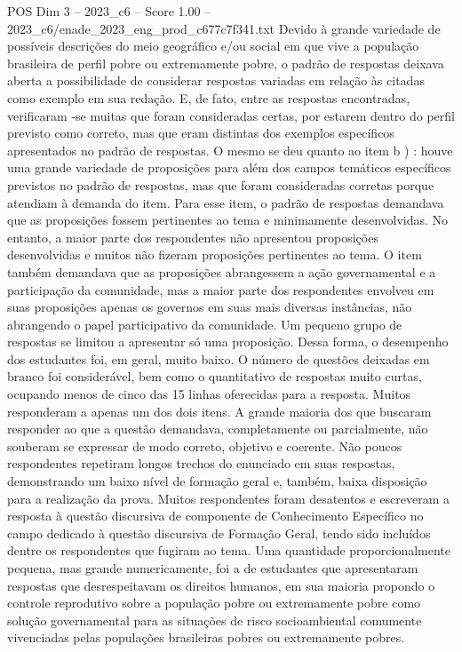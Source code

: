 \begin{textsample}{POS Dim 3 – 2023\_c6 – Score 1.00 – 2023\_c6/enade\_2023\_eng\_prod\_c677c7f341.txt}
Devido à grande variedade de possíveis descrições do meio geográfico e/ou social em que vive a população brasileira de perfil pobre ou extremamente pobre, o padrão de respostas deixava aberta a possibilidade de considerar respostas variadas em relação às citadas como exemplo em sua redação.
E, de fato, entre as respostas encontradas, verificaram -se muitas que foram consideradas certas, por estarem dentro do perfil previsto como correto, mas que eram distintas dos exemplos específicos apresentados no padrão de respostas.
O mesmo se deu quanto ao item b ) : houve uma grande variedade de proposições para além dos campos temáticos específicos previstos no padrão de respostas, mas que foram consideradas corretas porque atendiam à demanda do item.
Para esse item, o padrão de respostas demandava que as proposições fossem pertinentes ao tema e minimamente desenvolvidas.
No entanto, a maior parte dos respondentes não apresentou proposições desenvolvidas e muitos não fizeram proposições pertinentes ao tema.
O item também demandava que as proposições abrangessem a ação governamental e a participação da comunidade, mas a maior parte dos respondentes envolveu em suas proposições apenas os governos em suas mais diversas instâncias, não abrangendo o papel participativo da comunidade.
Um pequeno grupo de respostas se limitou a apresentar só uma proposição.
Dessa forma, o desempenho dos estudantes foi, em geral, muito baixo.
O número de questões deixadas em branco foi considerável, bem como o quantitativo de respostas muito curtas, ocupando menos de cinco das 15 linhas oferecidas para a resposta.
Muitos responderam a apenas um dos dois itens.
A grande maioria dos que buscaram responder ao que a questão demandava, completamente ou parcialmente, não souberam se expressar de modo correto, objetivo e coerente.
Não poucos respondentes repetiram longos trechos do enunciado em suas respostas, demonstrando um baixo nível de formação geral e, também, baixa disposição para a realização da prova.
Muitos respondentes foram desatentos e escreveram a resposta à questão discursiva de componente de Conhecimento Específico no campo dedicado à questão discursiva de Formação Geral, tendo sido incluídos dentre os respondentes que fugiram ao tema.
Uma quantidade proporcionalmente pequena, mas grande numericamente, foi a de estudantes que apresentaram respostas que desrespeitavam os direitos humanos, em sua maioria propondo o controle reprodutivo sobre a população pobre ou extremamente pobre como solução governamental para as situações de risco socioambiental comumente vivenciadas pelas populações brasileiras pobres ou extremamente pobres.

\end{textsample}
